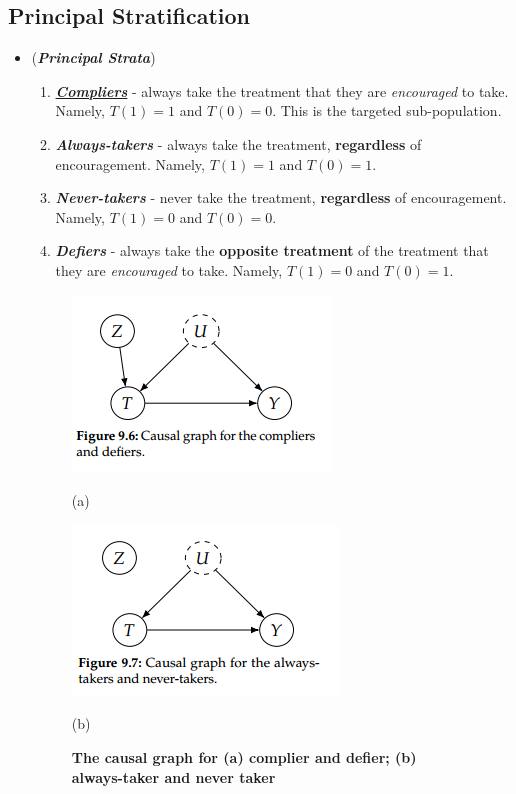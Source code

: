 \documentclass[11pt]{article}
\begin{document}
\subsection{Principal Stratification}
\begin{itemize}
\item \begin{definition} (\emph{\textbf{Principal Strata}})  \citep{imbens2015causal, neal2020introduction}
\begin{enumerate}
\item \underline{\textbf{\emph{Compliers}}} - always take the treatment that they are \emph{encouraged} to take. Namely, $T(1) = 1$ and $T(0) = 0$. This is the targeted sub-population.
\item \textbf{\emph{Always-takers}} - always take the treatment, \textbf{regardless} of encouragement. Namely, $T(1) = 1$ and $T(0) = 1$.
\item \textbf{\emph{Never-takers}} - never take the treatment, \textbf{regardless} of encouragement. Namely, $T(1) = 0$ and $T(0) = 0$.
\item \textbf{\emph{Defiers}} - always take the \textbf{opposite treatment} of the treatment that they are \emph{encouraged} to take. Namely, $T(1) = 0$ and $T(0) = 1$.
\end{enumerate}
\end{definition}

\begin{figure}
\begin{minipage}[t]{0.5\linewidth}
  \centering
  \centerline{\includegraphics[scale = 0.6]{complier_denier.png}}
  \vspace{-5pt}
  \centerline{(a)}
\end{minipage}
\begin{minipage}[t]{0.5\linewidth}
  \centering
  \centerline{\includegraphics[scale = 0.6]{always_never_takers.png}}
  \vspace{-5pt}
  \centerline{(b)}
\end{minipage}
\caption{\footnotesize{\textbf{The causal graph for (a) complier and defier; (b) always-taker and never taker }}}
\label{fig: principal_strata}
\end{figure}



\end{itemize}
\end{document}
